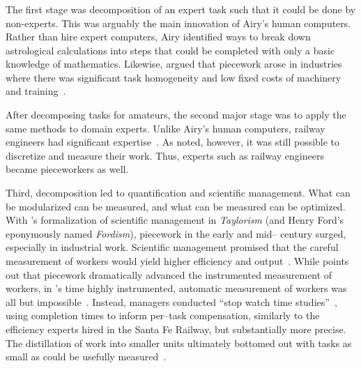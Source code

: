 \documentclass[trackingWork]{subfiles}
\begin{document}
\subsubsection{\pieceworkpers}

\begin{comment}
notes: what info do i assume the reader has seen already?
- Brown: Task variability matters
- Airy and his human computers were great:
  - quickly verifiable
  - independent tasks (could be checked without the whole product)
  - narrowly trainable
\end{comment}

The first stage was decomposition of an expert task such that it could be done by non-experts. 
This was arguably the main innovation of Airy's human computers.
Rather than hire expert computers, Airy identified ways to break down astrological calculations into steps that could be completed with only a basic knowledge of mathematics.
Likewise, \citeauthor{Brown01041990} argued that piecework arose in industries where there was significant task homogeneity and low fixed costs of machinery and training~\cite{Brown01041990}.

After decomposing tasks for amateurs, the second major stage was to apply the same methods to domain experts. 
Unlike Airy's human computers, railway engineers had significant expertise~\cite{Brown01041990}.
As \citeauthor{Brown01041990} noted, however, it was still possible to discretize and measure their work.
Thus, experts such as railway engineers became pieceworkers as well.

Third, decomposition led to quantification and scientific management.
What can be modularized can be measured, and what can be measured can be optimized.
With \citeauthor{taylor1914principles}'s formalization of scientific management in \textit{Taylorism}
(and Henry Ford's eponymously named \textit{Fordism}),
piecework in the early and mid-- century surged, especially in industrial work.
Scientific management promised that the careful measurement of workers would yield
higher efficiency and output~\cite{taylor1914principles,towardsGlobalFordism}.
While \citeauthor{Brown01041990} points out that
piecework dramatically advanced the instrumented measurement of workers,
in \citeauthor{taylor1914principles}'s time highly instrumented,
automatic measurement of workers was all but impossible~\cite{Brown01041990}.
Instead, managers conducted ``stop watch time studies''~\cite{nadworny1955scientific},
using completion times to inform per--task compensation,
similarly to the efficiency experts hired in the Santa Fe Railway, but
substantially more precise.
The distillation of work into smaller units ultimately bottomed out with tasks as small as could be usefully measured~\cite{10.2307/23702539}.
\end{document}
